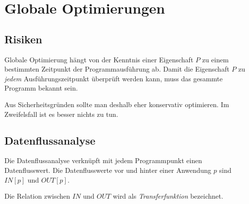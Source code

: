 \section{Globale Optimierungen}

\subsection{Risiken}

Globale Optimierung hängt von der Kenntnis einer Eigenschaft $P$ zu einem bestimmten Zeitpunkt der
Programmausführung ab. Damit die Eigenschaft $P$ zu \textit{jedem} Ausführungszeitpunkt überprüft
werden kann, muss das gesammte Programm bekannt sein.

Aus Sicherheitsgründen sollte man deshalb eher konservativ optimieren. Im Zweifelsfall ist es besser
nichts zu tun.

\subsection{Datenflussanalyse}

Die Datenflussanalyse verknüpft mit jedem Programmpunkt einen Datenflusswert. Die Datenflusswerte
vor und hinter einer Anwendung $p$ sind $IN[p]$ und $OUT[p]$.

Die Relation zwischen $IN$ und $OUT$ wird als \textit{Transferfunktion} bezeichnet.
